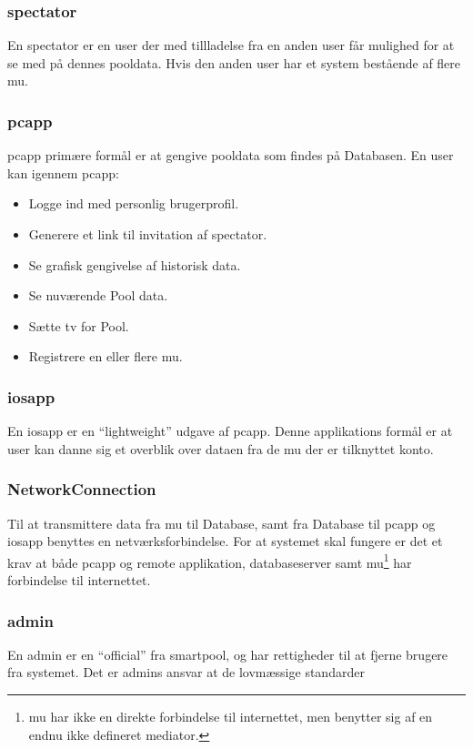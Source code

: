 \subsubsection{\Gls{spectator}}
En \gls{spectator} er en \gls{user} der med tillladelse fra en anden \gls{user} får mulighed for at se med på dennes pooldata. Hvis den anden \gls{user} har et system bestående af flere \gls{mu}.

\subsubsection{\gls{pcapp}}
\gls{pcapp} primære formål er at gengive pooldata som findes på Databasen. En \gls{user} kan igennem \gls{pcapp}:

\begin{itemize}
	\item Logge ind med personlig brugerprofil.
	\item Generere et link til invitation af \gls{spectator}.
	\item Se grafisk gengivelse af historisk data.
	\item Se nuværende Pool data.
	\item Sætte \gls{tv} for Pool.
	\item Registrere en eller flere \gls{mu}.
\end{itemize}

\subsubsection{\gls{iosapp}}
En \gls{iosapp} er en “lightweight” udgave af \gls{pcapp}. Denne applikations formål er at \gls{user} kan danne sig et overblik over dataen fra de \gls{mu} der er tilknyttet konto.

\subsubsection{NetworkConnection}
Til at transmittere data fra \gls{mu} til Database, samt fra Database til \gls{pcapp} og \gls{iosapp} benyttes en netværksforbindelse.  For at systemet skal fungere er det et krav at både \gls{pcapp} og remote applikation, databaseserver samt \gls{mu}\footnote{  \gls{mu} har ikke en direkte forbindelse til internettet, men benytter sig af en endnu ikke defineret mediator.} har forbindelse til internettet.

\subsubsection{\gls{admin}}
En \gls{admin} er en “official” fra \gls{smartpool}, og har rettigheder til at fjerne brugere fra systemet. Det er \glspl{admin} ansvar at de lovmæssige standarder%

